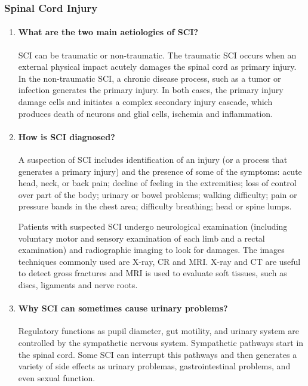 \documentclass[12pt,article,oneside,a4paper]{memoir}
\begin{document}
\subsubsection{Spinal Cord Injury}
\begin{enumerate}
\item \paragraph{What are the two main aetiologies of SCI?}
SCI can be traumatic or non-traumatic.
The traumatic SCI occurs when an external physical impact acutely damages the
spinal cord as primary injury. In the non-traumatic SCI, a chronic disease
process, such as a tumor or infection generates the primary injury.
In both cases, the primary injury damage cells and initiates a complex secondary
injury cascade, which produces death of neurons and glial cells, ischemia and
inflammation.

\item \paragraph{How is SCI diagnosed?}
A suspection of SCI includes identification of an injury (or a process that
generates a primary injury) and the presence of some of the symptoms: acute
head, neck, or back pain; decline of feeling in the extremities; loss of
control over part of the body; urinary or bowel problems; walking difficulty;
pain or pressure bands in the chest area; difficulty breathing; head or spine
lumps.

Patients with suspected SCI undergo neurological examination (including
voluntary motor and sensory examination of each limb and a rectal examination)
and radiographic imaging to look for damages. The images techniques commonly
used are X-ray, CR and MRI. X-ray and CT are useful to detect gross fractures
and MRI is used to evaluate soft tissues, such as discs, ligaments and nerve
roots.

\item \paragraph{Why SCI can sometimes cause urinary problems?}
Regulatory functions as pupil diameter, gut motility, and urinary system are
controlled by the sympathetic nervous system. Sympathetic pathways start in the
spinal cord. Some SCI can interrupt this pathways and then generates a variety
of side effects as urinary problemas, gastrointestinal problems, and even
sexual function.


\end{enumerate}
\end{document}
